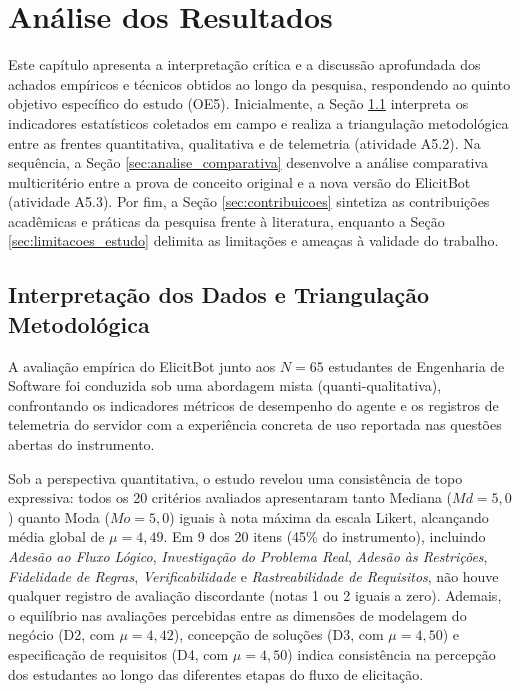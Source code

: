 \chapter{Análise dos Resultados}
\label{cap:analise}

Este capítulo apresenta a interpretação crítica e a discussão aprofundada dos achados empíricos e técnicos obtidos ao longo da pesquisa, respondendo ao quinto objetivo específico do estudo (OE5). Inicialmente, a Seção \ref{sec:triangulacao_resultados} interpreta os indicadores estatísticos coletados em campo e realiza a triangulação metodológica entre as frentes quantitativa, qualitativa e de telemetria (atividade A5.2). Na sequência, a Seção \ref{sec:analise_comparativa} desenvolve a análise comparativa multicritério entre a prova de conceito original e a nova versão do ElicitBot (atividade A5.3). Por fim, a Seção \ref{sec:contribuicoes} sintetiza as contribuições acadêmicas e práticas da pesquisa frente à literatura, enquanto a Seção \ref{sec:limitacoes_estudo} delimita as limitações e ameaças à validade do trabalho.

\section{Interpretação dos Dados e Triangulação Metodológica}
\label{sec:triangulacao_resultados}

A avaliação empírica do ElicitBot junto aos $N = 65$ estudantes de Engenharia de Software foi conduzida sob uma abordagem mista (quanti-qualitativa), confrontando os indicadores métricos de desempenho do agente e os registros de telemetria do servidor com a experiência concreta de uso reportada nas questões abertas do instrumento.

Sob a perspectiva quantitativa, o estudo revelou uma consistência de topo expressiva: todos os 20 critérios avaliados apresentaram tanto Mediana ($Md = 5,0$) quanto Moda ($Mo = 5,0$) iguais à nota máxima da escala Likert, alcançando média global de $\mu = 4,49$. Em 9 dos 20 itens (45\% do instrumento), incluindo \textit{Adesão ao Fluxo Lógico}, \textit{Investigação do Problema Real}, \textit{Adesão às Restrições}, \textit{Fidelidade de Regras}, \textit{Verificabilidade} e \textit{Rastreabilidade de Requisitos}, não houve qualquer registro de avaliação discordante (notas 1 ou 2 iguais a zero). Ademais, o equilíbrio nas avaliações percebidas entre as dimensões de modelagem do negócio (D2, com $\mu = 4,42$), concepção de soluções (D3, com $\mu = 4,50$) e especificação de requisitos (D4, com $\mu = 4,50$) indica consistência na percepção dos estudantes ao longo das diferentes etapas do fluxo de elicitação.

